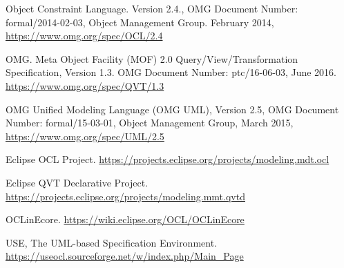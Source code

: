 \documentclass[
]{ceurart}
\begin{document}
\begin{thebibliography}{}
Object Constraint Language. Version 2.4., OMG Document Number: formal/2014-02-03, Object Management Group. February 2014,  \url{https://www.omg.org/spec/OCL/2.4}

OMG. Meta Object Facility (MOF) 2.0 Query/View/Transformation Specification, Version 1.3.
OMG Document Number: ptc/16-06-03, June 2016.
\url{https://www.omg.org/spec/QVT/1.3}

OMG Unified Modeling Language (OMG UML), Version 2.5, {OMG Document Number}: formal/15-03-01, Object Management Group, March 2015,\\ \url{https://www.omg.org/spec/UML/2.5}

Eclipse OCL Project.
\url{https://projects.eclipse.org/projects/modeling.mdt.ocl}

Eclipse QVT Declarative Project.\\
\url{https://projects.eclipse.org/projects/modeling.mmt.qvtd}

OCLinEcore.
\url{https://wiki.eclipse.org/OCL/OCLinEcore}

USE, The UML-based Specification Environment. \\ \url{https://useocl.sourceforge.net/w/index.php/Main\_Page}

\end{thebibliography}
\end{document}
